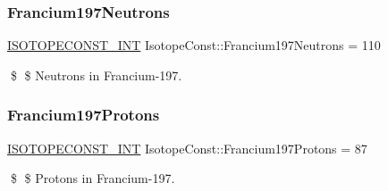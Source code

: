 \subsubsection{\texorpdfstring{Francium197\+Neutrons}{Francium197Neutrons}}
{\footnotesize\ttfamily \mbox{\hyperlink{group___isotope_const-_macros_ga5f18360b3e99483a35c32d789e62621c}{I\+S\+O\+T\+O\+P\+E\+C\+O\+N\+S\+T\+\_\+\+I\+NT}} Isotope\+Const\+::\+Francium197\+Neutrons = 110}

\$ \$ Neutrons in Francium-\/197. \mbox{\label{group___isotope_const-_francium-_fr197_ga27c0e0655bc7c55cc5f9029da25a718e}} 
\subsubsection{\texorpdfstring{Francium197\+Protons}{Francium197Protons}}
{\footnotesize\ttfamily \mbox{\hyperlink{group___isotope_const-_macros_ga5f18360b3e99483a35c32d789e62621c}{I\+S\+O\+T\+O\+P\+E\+C\+O\+N\+S\+T\+\_\+\+I\+NT}} Isotope\+Const\+::\+Francium197\+Protons = 87}

\$ \$ Protons in Francium-\/197. 